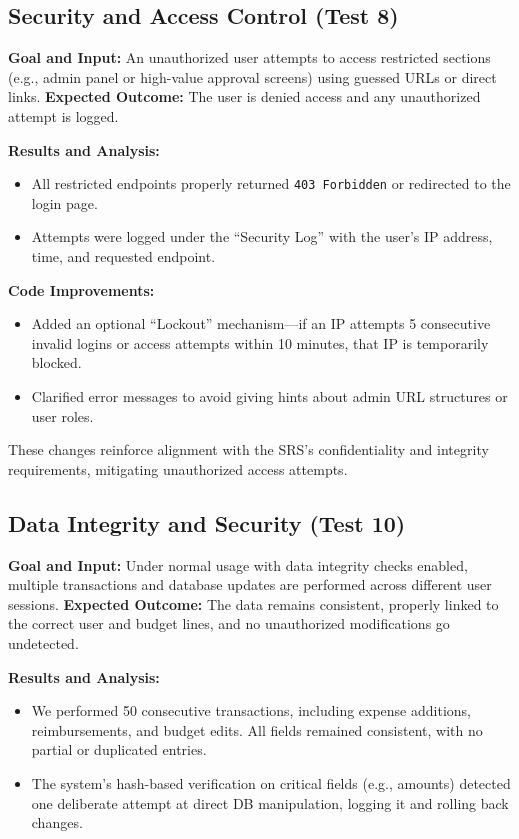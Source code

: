 \documentclass[12pt, titlepage]{article}
\begin{document}
\subsection{Security and Access Control (Test 8)}

\noindent
\textbf{Goal and Input:}  
An unauthorized user attempts to access restricted sections (e.g., admin panel or high-value approval screens) using guessed URLs or direct links.  
\textbf{Expected Outcome:} The user is denied access and any unauthorized attempt is logged.

\noindent
\textbf{Results and Analysis:}  
\begin{itemize}
  \item All restricted endpoints properly returned \texttt{403 Forbidden} or redirected to the login page.
  \item Attempts were logged under the “Security Log” with the user’s IP address, time, and requested endpoint.
\end{itemize}

\noindent
\textbf{Code Improvements:}
\begin{itemize}
  \item Added an optional “Lockout” mechanism—if an IP attempts 5 consecutive invalid logins or access attempts within 10 minutes, that IP is temporarily blocked.
  \item Clarified error messages to avoid giving hints about admin URL structures or user roles.
\end{itemize}
These changes reinforce alignment with the SRS’s confidentiality and integrity requirements, mitigating unauthorized access attempts.

\subsection{Data Integrity and Security (Test 10)}

\noindent
\textbf{Goal and Input:}  
Under normal usage with data integrity checks enabled, multiple transactions and database updates are performed across different user sessions.  
\textbf{Expected Outcome:} The data remains consistent, properly linked to the correct user and budget lines, and no unauthorized modifications go undetected.

\noindent
\textbf{Results and Analysis:}  
\begin{itemize}
  \item We performed 50 consecutive transactions, including expense additions, reimbursements, and budget edits. All fields remained consistent, with no partial or duplicated entries.
  \item The system’s hash-based verification on critical fields (e.g., amounts) detected one deliberate attempt at direct DB manipulation, logging it and rolling back changes.
\end{itemize}
\end{document}
